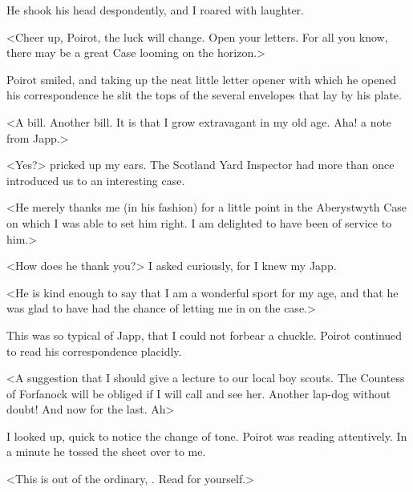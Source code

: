  He shook his head despondently, and I roared with laughter. 

 <Cheer up, Poirot, the luck will change. Open your letters. For all you know, there may be a great Case looming on the horizon.> 

 Poirot smiled, and taking up the neat little letter opener with which he opened his correspondence he slit the tops of the several envelopes that lay by his plate. 

 <A bill. Another bill. It is that I grow extravagant in my old age. Aha! a note from Japp.> 

 <Yes?> pricked up my ears. The Scotland Yard Inspector had more than once introduced us to an interesting case. 

 <He merely thanks me (in his fashion) for a little point in the Aberystwyth Case on which I was able to set him right. I am delighted to have been of service to him.> 

 <How does he thank you?> I asked curiously, for I knew my Japp. 

 <He is kind enough to say that I am a wonderful sport for my age, and that he was glad to have had the chance of letting me in on the case.> 

 This was so typical of Japp, that I could not forbear a chuckle. Poirot continued to read his correspondence placidly. 

 <A suggestion that I should give a lecture to our local boy scouts. The Countess of Forfanock will be obliged if I will call and see her. Another lap-dog without doubt! And now for the last. Ah\longdash> 

 I looked up, quick to notice the change of tone. Poirot was reading attentively. In a minute he tossed the sheet over to me. 

 <This is out of the ordinary, . Read for yourself.> 


